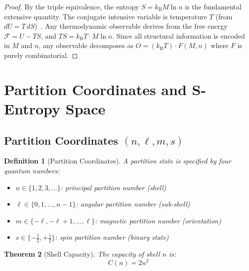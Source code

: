 \documentclass[10pt,twocolumn]{article}
\newtheorem{theorem}{Theorem}[section]
\newtheorem{definition}[theorem]{Definition}
\theoremstyle{remark}
\newcommand{\kB}{k_{\mathrm{B}}}
\begin{document}
\begin{proof}
By the triple equivalence, the entropy $S = \kB M \ln n$ is the fundamental extensive quantity. The conjugate intensive variable is temperature $T$ (from $dU = T\,dS$)~\cite{callen1985thermodynamics}. Any thermodynamic observable derives from the free energy $\mathcal{F} = U - TS$, and $TS = \kB T \cdot M \ln n$. Since all structural information is encoded in $M$ and $n$, any observable decomposes as $O = (\kB T) \cdot F(M,n)$ where $F$ is purely combinatorial.
\end{proof}

\section{Partition Coordinates and S-Entropy Space}
\label{sec:partition}

\subsection{Partition Coordinates $(n, \ell, m, s)$}

\begin{definition}[Partition Coordinates]
\label{def:coords}
A partition state is specified by four quantum numbers:
\begin{itemize}[noitemsep]
\item $n \in \{1, 2, 3, \ldots\}$: principal partition number (shell)
\item $\ell \in \{0, 1, \ldots, n-1\}$: angular partition number (sub-shell)
\item $m \in \{-\ell, -\ell+1, \ldots, \ell\}$: magnetic partition number (orientation)
\item $s \in \{-\tfrac{1}{2}, +\tfrac{1}{2}\}$: spin partition number (binary state)
\end{itemize}
\end{definition}

\begin{theorem}[Shell Capacity]
\label{thm:capacity}
The capacity of shell $n$ is:
\begin{equation}
\boxed{C(n) = 2n^2}
\label{eq:capacity}
\end{equation}
\end{theorem}
\end{document}
